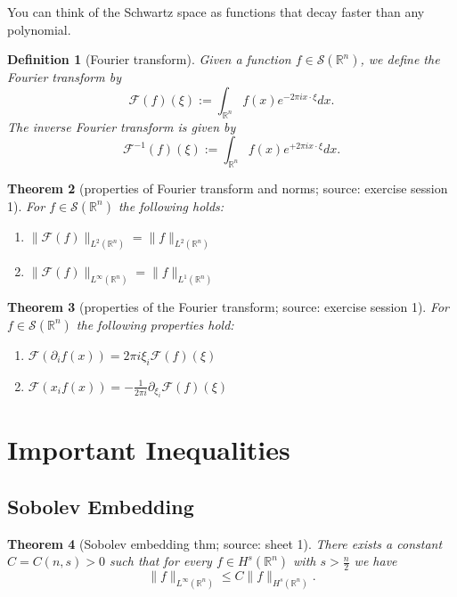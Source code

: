 \documentclass[12pt,a4paper]{article}
\newtheorem{definition}{Definition}
\newtheorem{thm}[definition]{Theorem}
\newcommand{\Rn}{\mathbb{R}^n}
\begin{document}
You can think of the Schwartz space as functions that decay faster than any polynomial.

\begin{definition}[Fourier transform]
Given a function $f\in \mathcal{S}(\mathbb{R}^n)$, we define the Fourier transform by
\begin{equation}
\mathcal{F}(f)(\xi):=\int_{\Rn} f(x)e^{-2\pi ix\cdot \xi} dx.
\end{equation}
The inverse Fourier transform is given by
\begin{equation}
\mathcal{F}^{-1}(f)(\xi):=\int_{\Rn} f(x)e^{+2\pi ix\cdot \xi} dx.
\end{equation}
\end{definition}

\begin{thm}[properties of Fourier transform and norms; source: exercise session 1]
For $f\in \mathcal{S}(\mathbb{R}^n)$ the following holds:
\begin{enumerate}
\item $\lVert \mathcal{F}(f) \rVert_{L^2(\mathbb{R}^n)} = \lVert f \rVert_{L^2(\mathbb{R}^n)}$
\item $\lVert \mathcal{F}(f) \rVert_{L^{\infty}(\mathbb{R}^n)} = \lVert f \rVert_{L^1(\mathbb{R}^n)}$
\end{enumerate}
\end{thm}

\begin{thm}[properties of the Fourier transform; source: exercise session 1]
For $f\in \mathcal{S}(\mathbb{R}^n)$ the following properties hold:
\begin{enumerate}
\item $\mathcal{F}(\partial_if(x))=2\pi i \xi_i \mathcal{F}(f)(\xi)$ 
\item $\mathcal{F}(x_if(x))=-\frac{1}{2\pi i} \partial_{\xi_i} \mathcal{F}(f)(\xi)$
\end{enumerate}
\end{thm}

\section{Important Inequalities}

\subsection{Sobolev Embedding}

\begin{thm}[Sobolev embedding thm; source: sheet 1]
There exists a constant $C=C(n,s)>0$ such that for every $f\in H^s(\mathbb{R}^n)$ with $s>\frac{n}{2}$ we have
\begin{equation}
\lVert f \rVert_{L^{\infty}(\mathbb{R}^n)} \leq C \lVert f \rVert _{H^s(\mathbb{R}^n)}.
\end{equation}
\end{thm}
\end{document}
